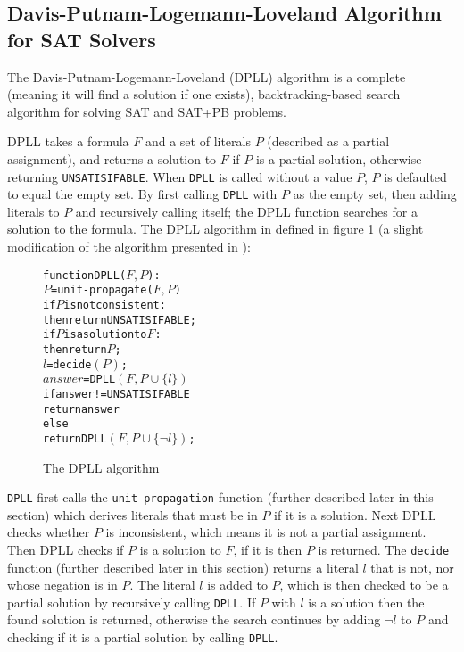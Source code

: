\subsection{Davis-Putnam-Logemann-Loveland Algorithm for SAT Solvers}
The Davis-Putnam-Logemann-Loveland (DPLL) algorithm \citep{Davis1960, davis1962machine} is a complete (meaning it will find a solution if one exists), 
backtracking-based search algorithm for solving SAT and SAT+PB problems.


DPLL takes a formula $F$ and a set of literals $P$ (described as a partial assignment), and returns a solution to $F$ if $P$ is a partial solution, 
otherwise returning \verb+UNSATISIFABLE+.
When \texttt{DPLL} is called without a value $P$, $P$ is defaulted to equal the empty set.
By first calling \texttt{DPLL} with $P$ as the empty set, then adding literals to $P$ and recursively calling itself; 
the DPLL function searches for a solution to the formula.
The DPLL algorithm in defined in figure \ref{impl.DPLL} (a slight modification of the algorithm presented in \citep{dixon2004automating}):
\begin{figure}[h]
\begin{center}
\begin{alltt}
function DPLL(\(F, P\)):
   \(P\) = unit-propagate(\(F, P\))
   if \(P\) is not consistent:
       then return UNSATISIFABLE;
   if \(P\) is a solution to \(F\):
       then return \(P\);
   \(l\) = decide\((P)\);
   \(answer\) = DPLL\((F, P \cup \{l\})\)
   if answer != UNSATISIFABLE 
       return answer
   else
       return DPLL\((F, P \cup \{\neg l\})\);
\end{alltt}
  \caption{The DPLL algorithm}
  \label{impl.DPLL}
\end{center}
\end{figure}

\texttt{DPLL} first calls the \texttt{unit-propagation} function (further described later in this section) which derives literals that must be in $P$ if it is a solution.
Next DPLL checks whether $P$ is inconsistent, which means it is not a partial assignment.
Then DPLL checks if $P$ is a solution to $F$, if it is then $P$ is returned.
The \texttt{decide} function (further described later in this section) returns a literal $l$ that is not, nor whose negation is in $P$.
The literal $l$ is added to $P$, which is then checked to be a partial solution by recursively calling \texttt{DPLL}.
If $P$ with $l$ is a solution then the found solution is returned,
otherwise the search continues by adding $\neg l$ to $P$ and checking if it is a partial solution by calling \texttt{DPLL}.

